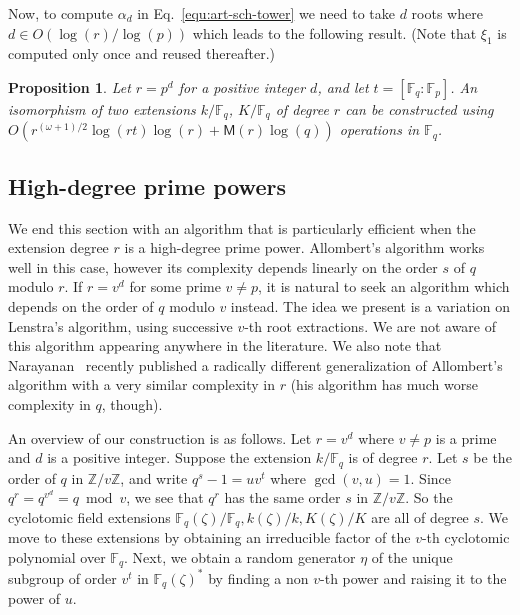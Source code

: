 \documentclass{mcom-l}
\theoremstyle{plain}
\newtheorem{proposition}[theorem]{Proposition}
\theoremstyle{definition}
\newcommand{\Z}{\ensuremath{\mathbb{Z}}}
\newcommand{\F}{\ensuremath{\mathbb{F}}}
\newcommand{\MM}{\ensuremath{\mathsf{M}}}
\newcounter{algorithm}
\begin{document}
Now, to compute $\alpha_d$ in Eq.~\eqref{equ:art-sch-tower} we 
need to take $d$ roots where $d \in O(\log(r) / \log(p))$ which leads to the following result. (Note that $\xi_1$ is computed only once and reused thereafter.)

\begin{proposition}
	Let $r = p^d$ for a positive integer $d$, and let $t = [\F_q : \F_p]$. An isomorphism of two 
	extensions $k / \F_q$, $K / \F_q$ of degree $r$ can be constructed using 
	$O(r^{(\omega+1)/2}\log(rt)\log(r) + \MM(r)\log(q))$ operations in $\F_q$.
\end{proposition}


\subsection{High-degree prime powers}
\label{sec:fast-algor-large}

We end this section with an algorithm that is particularly efficient when the extension 
degree $r$ is a high-degree prime power.
Allombert's algorithm works well in this case, however its
complexity depends linearly on the order $s$ of $q$ modulo $r$. If $r=v^d$ for some prime $v\ne p$,
it is natural to seek an algorithm which depends on the order of $q$ modulo $v$ instead.
The idea we present is a variation on Lenstra's algorithm, using successive $v$-th root
extractions.
We are not aware of this algorithm appearing anywhere in the literature. %
We also note that Narayanan~\cite[Sec.~5]{narayanan2016fast} recently
published a radically different generalization
of Allombert's algorithm with a very similar complexity in $r$ (his
algorithm has much worse complexity in $q$, though).

An overview of our construction is as follows. Let $r = v^d$ where $v \ne p$ is a 
prime and $d$ is a positive integer. Suppose the extension $k/\F_q$ is of degree $r$. Let $s$ be 
the order of $q$ in $\Z / v\Z$, and write $q^s - 1 = uv^t$ where $\gcd(v, u) = 1$. Since $q^r = 
q^{v^d} = q \bmod v$, we see that $q^r$ has the same order $s$ in $\Z / v\Z$. So the cyclotomic 
field extensions $\F_q(\zeta) / \F_q, k(\zeta) / k, K(\zeta) / K$ are all of degree $s$. We move to 
these extensions by obtaining an irreducible factor of the $v$-th cyclotomic polynomial over 
$\F_q$. Next, we obtain a random generator $\eta$ of the unique subgroup of order $v^t$ in 
$\F_q(\zeta)^*$ by finding a non $v$-th power and raising it to the power of $u$.
\end{document}

